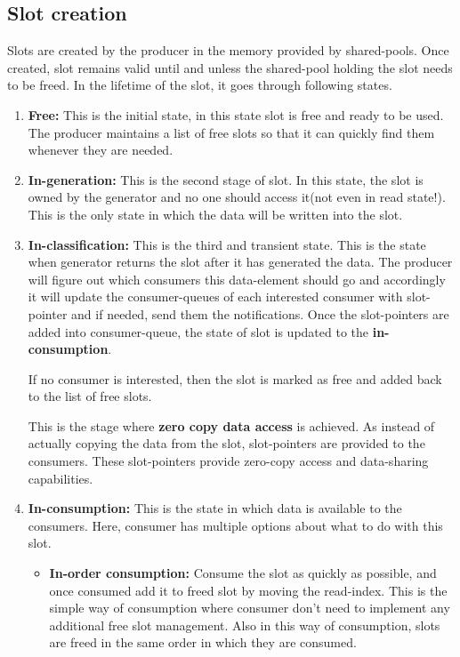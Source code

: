 \documentclass[a4paper,twoside]{report} %
\begin{document}
\subsection{Slot creation}
Slots are created by the producer in the memory provided by 
shared-pools.  Once created, slot remains valid until and unless the
shared-pool holding the slot needs to be freed.  In the lifetime of
the slot, it goes through following states.
\begin{enumerate}
  \item \textbf{Free:} This is the initial state, in this state slot
  is free and ready to be used.  The producer maintains a list of free
  slots so that it can quickly find them whenever they are needed.

  \item \textbf{In-generation:} This is the second stage of slot. In
  this state, the slot is owned by the generator and no one should 
  access it(not even in read state!).  This is the only state in which
  the data will be written into the slot.

  \item \textbf{In-classification:} This is the third and transient
  state.  This is the state when generator returns the slot after it
  has generated the data.  The producer will figure out which
  consumers this data-element should go and accordingly it will update
  the consumer-queues of each interested consumer with slot-pointer
  and if needed, send them the notifications.  Once the slot-pointers
  are added into consumer-queue, the state of slot is updated to the
  \textbf{in-consumption}.
  
  If no consumer is interested, then the slot is marked as free and 
  added back to the list of free slots.


  This is the stage where \textbf{zero copy data access} is achieved.
  As instead of actually copying the data from the slot, slot-pointers
  are provided to the consumers.  These slot-pointers provide
  zero-copy access and data-sharing capabilities.


  \item \textbf{In-consumption:} This is the state in which data is
  available to the consumers.  Here, consumer has multiple options
  about what to do with this slot.
  \begin{itemize}
    \item \textbf{In-order consumption:} 
    Consume the slot as quickly as possible, and once consumed
    add it to freed slot by moving the read-index.  This is the simple
    way of consumption where consumer don't need to implement
    any additional free slot management.  Also in this way of
    consumption, slots are freed in the same order in which they are
    consumed. 


\end{itemize}
\end{enumerate}
\end{document}
